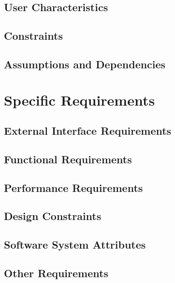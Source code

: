 \documentclass[a4paper,12pt]{article}
\begin{document}
\subsection{User Characteristics}

\subsection{Constraints}

\subsection{Assumptions and Dependencies}

\section{Specific Requirements}

\subsection{External Interface Requirements}

\subsection{Functional Requirements}

\subsection{Performance Requirements}

\subsection{Design Constraints}

\subsection{Software System Attributes}

\subsection{Other Requirements}

\newpage
\clearpage
{}
\end{document}
